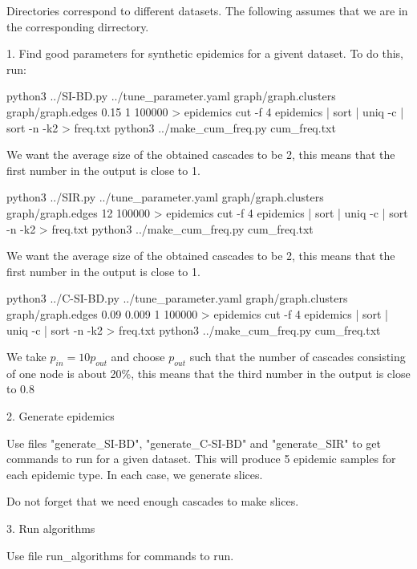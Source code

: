 Directories correspond to different datasets. The following assumes that we are in the corresponding dirrectory.

1. Find good parameters for synthetic epidemics for a givent dataset. To do this, run: 

python3 ../SI-BD.py ../tune_parameter.yaml graph/graph.clusters graph/graph.edges 0.15 1 100000 > epidemics
cut -f 4 epidemics | sort | uniq -c | sort -n -k2 > freq.txt
python3 ../make_cum_freq.py cum_freq.txt

We want the average size of the obtained cascades to be 2, this means that the first number in the output is close to 1.

python3 ../SIR.py ../tune_parameter.yaml graph/graph.clusters graph/graph.edges 12 100000 > epidemics
cut -f 4 epidemics | sort | uniq -c | sort -n -k2 > freq.txt
python3 ../make_cum_freq.py cum_freq.txt

We want the average size of the obtained cascades to be 2, this means that the first number in the output is close to 1.

python3 ../C-SI-BD.py ../tune_parameter.yaml graph/graph.clusters graph/graph.edges 0.09 0.009 1 100000 > epidemics
cut -f 4 epidemics | sort | uniq -c | sort -n -k2 > freq.txt
python3 ../make_cum_freq.py cum_freq.txt

We take $p_{in} = 10 p_{out}$ and choose $p_{out}$ such that the number of cascades consisting of one node is about 20\%, this means that the third number in the output is close to 0.8


2. Generate epidemics

Use files "generate_SI-BD", "generate_C-SI-BD" and "generate_SIR" to get commands to run for a given dataset. This will produce 5 epidemic samples for each epidemic type. In each case, we generate slices.

Do not forget that we need enough cascades to make slices.

3. Run algorithms

Use file run_algorithms for commands to run.